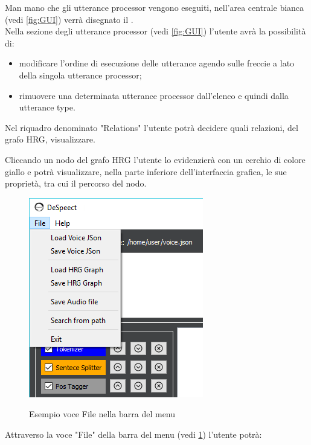 \documentclass[../AnalisideiRequisiti.tex]{subfiles}
\begin{document}
		 Man mano che gli utterance processor vengono eseguiti, nell'area centrale bianca (vedi \ref{fig:GUI}) verrà disegnato il .
		 \\Nella sezione degli utterance processor (vedi \ref{fig:GUI}) l'utente avrà la possibilità di:
		\begin{itemize}
			\item{}modificare l'ordine di esecuzione delle utterance agendo sulle freccie a lato della singola utterance processor;
			\item{}rimuovere una determinata utterance processor dall'elenco e quindi dalla utterance type.
		\end{itemize}
		Nel riquadro denominato "Relations" l'utente potrà decidere quali relazioni, del grafo HRG, visualizzare.
	
		 Cliccando un nodo del grafo HRG l'utente lo evidenzierà con un cerchio di colore giallo e potrà visualizzare, nella parte inferiore dell'interfaccia grafica, le sue proprietà, tra cui il percorso del nodo.
	\begin{figure}[htp]
	\caption{Esempio voce File nella barra del menu}
	\centering
	\includegraphics[]{../img/menu-file.png}
	\label{fig:menufile}
\end{figure}
	 Attraverso la voce "File" della barra del menu (vedi \ref{fig:menufile}) l'utente potrà:
	 	
\end{document}
